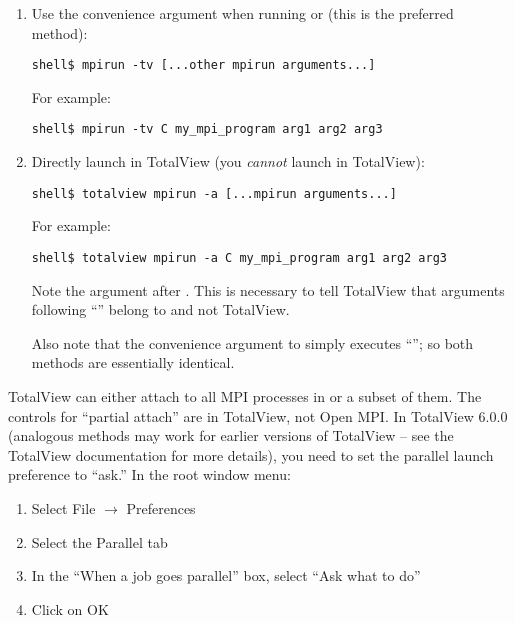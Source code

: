 \begin{enumerate}
\item Use the  convenience argument when running
   or  (this is the preferred method):

  \lstset{style=ompi-cmdline}
  \begin{lstlisting}
shell$ mpirun -tv [...other mpirun arguments...]
  \end{lstlisting}

  For example:
  
  \lstset{style=ompi-cmdline}
  \begin{lstlisting}
shell$ mpirun -tv C my_mpi_program arg1 arg2 arg3
  \end{lstlisting}

\item Directly launch  in TotalView (you {\em cannot}
  launch  in TotalView):
  
  \lstset{style=ompi-cmdline}
  \begin{lstlisting}
shell$ totalview mpirun -a [...mpirun arguments...]
  \end{lstlisting}
  
  For example:
  
  \lstset{style=ompi-cmdline}
  \begin{lstlisting}
shell$ totalview mpirun -a C my_mpi_program arg1 arg2 arg3
  \end{lstlisting}
  
  Note the  argument after .  This is necessary
  to tell TotalView that arguments following ``'' belong to
   and not TotalView.
  
  Also note that the  convenience argument to 
  simply executes ``''; so both methods
  are essentially identical.
\end{enumerate}
        
TotalView can either attach to all MPI processes in
 or a subset of them.  The controls for
``partial attach'' are in TotalView, not Open MPI.  In TotalView 6.0.0
(analogous methods may work for earlier versions of TotalView -- see
the TotalView documentation for more details), you need to set the
parallel launch preference to ``ask.''  In the root window menu:

\begin{enumerate}
\item Select File $\rightarrow$ Preferences
\item Select the Parallel tab
\item In the ``When a job goes parallel'' box, select ``Ask what to do''
\item Click on OK
\end{enumerate}

